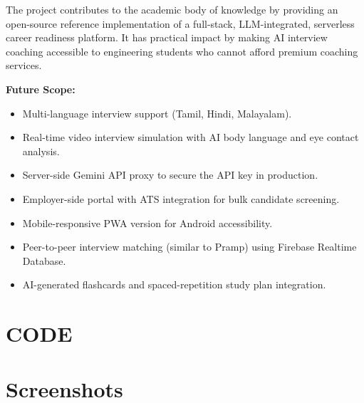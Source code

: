 The project contributes to the academic body of knowledge by providing an open-source reference
implementation of a full-stack, LLM-integrated, serverless career readiness platform. It has
practical impact by making AI interview coaching accessible to engineering students who cannot
afford premium coaching services.

\noindent\textbf{Future Scope:}
\begin{itemize}
	\item Multi-language interview support (Tamil, Hindi, Malayalam).
	\item Real-time video interview simulation with AI body language and eye contact analysis.
	\item Server-side Gemini API proxy to secure the API key in production.
	\item Employer-side portal with ATS integration for bulk candidate screening.
	\item Mobile-responsive PWA version for Android accessibility.
	\item Peer-to-peer interview matching (similar to Pramp) using Firebase Realtime Database.
	\item AI-generated flashcards and spaced-repetition study plan integration.
\end{itemize}

\renewcommand\bibname{References}

{\thispagestyle{empty}}

\thispagestyle{empty}

\newpage
{}
\begin{appendices}
\chapter{CODE}
\chapter{Screenshots}
\end{appendices}


